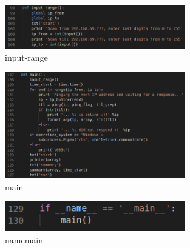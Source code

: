\begin{figure}[H]
  \centering
  \includegraphics[width=0.7\textwidth]{figures/code/input-range}
  \caption{input-range}
  \label{f:input-range}
\end{figure}

\begin{figure}[H]
  \centering
  \includegraphics[width=0.7\textwidth]{figures/code/main}
  \caption{main}
  \label{f:main}
\end{figure}

\begin{figure}[H]
  \centering
  \includegraphics[width=0.7\textwidth]{figures/code/namemain}
  \caption{namemain}
  \label{f:namemain}
\end{figure}
